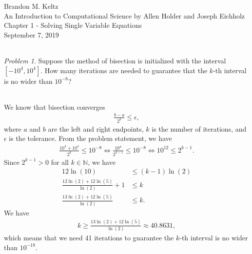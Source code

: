 \documentclass{article}
\begin{document}
	\begin{flushleft}

		Brandon M. Keltz\\
		An Introduction to Computational Science by Allen Holder and Joseph Eichholz\\
		Chapter 1 - Solving Single Variable Equations\\
		September 7, 2019\\\

		\textit{Problem 1}. Suppose the method of bisection is initialized with the interval $\left[-10^4, 10^4 \right]$. How many iterations are needed to guarantee that the $k$-th interval is no wider than $10^{-8}$?\\\

		We know that bisection converges
		\begin{align*}
			\frac{b - a}{2^k} \leq \epsilon,
		\end{align*}
		where $a$ and $b$ are the left and right endpoints, $k$ is the number of iterations, and $\epsilon$ is the tolerance. From the problem statement, we have
		\begin{align*}
			\frac{10^4 + 10^4}{2^k} \leq 10^{-8} \iff \frac{10^4}{2^{k - 1}} \leq 10^{-8} \iff 10^{12} \leq 2^{k - 1}.
		\end{align*}
		Since $2^{k - 1} > 0$ for all $k \in \mathbb{N}$, we have
		\begin{align*}
			12 \ln \left( 10 \right) & \leq \left( k - 1 \right) \ln \left( 2 \right) \\
			\frac{12 \ln \left( 2 \right) + 12 \ln \left( 5 \right)}{\ln \left( 2 \right)} + 1 & \leq k \\
			\frac{13 \ln \left( 2 \right) + 12 \ln \left( 5 \right)}{\ln \left( 2 \right)} & \leq k.
		\end{align*}
		We have
		\begin{align*}
			k \geq \frac{13 \ln \left( 2 \right) + 12 \ln \left( 5 \right)}{\ln \left( 2 \right)} \approx 40.8631,
		\end{align*}
		which means that we need 41 iterations to guarantee the $k$-th interval is no wider than $10^{-18}$.

	\end{flushleft}
\end{document}
